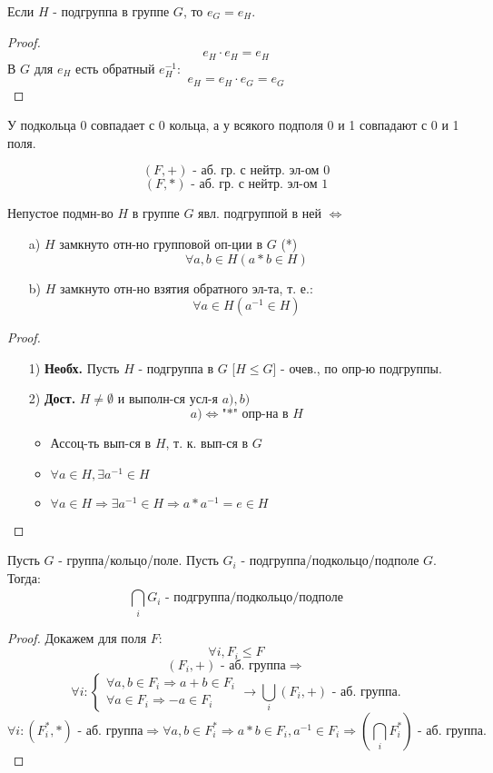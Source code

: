 \begin{statement}
Если $H$ - подгруппа в группе $G$, то $e_G = e_H$.
\end{statement}
\begin{proof}
\[
e_H \cdot e_H = e_H
\]
В $G$ для $e_H$ есть обратный $e_H^{-1}$:
\[
e_H = e_H \cdot e_G = e_G
\]
\end{proof}
\begin{consequence}
У подкольца $0$ совпадает с $0$ кольца, а у всякого подполя 0 и 1 совпадают с 0 и 1 поля.
\end{consequence}
\[
  (F, +) \text{ - аб. гр. с нейтр. эл-ом 0}
\]
\[
  (F, *) \text{ - аб. гр. с нейтр. эл-ом 1}
\]
\begin{statement}
Непустое подмн-во $H$ в группе $G$ явл. подгруппой в ней $\iff$
\begin{itemize}
  \item [a) ] $H$ замкнуто отн-но групповой оп-ции в $G$ (*)
    \[
    \forall a, b \in H (a * b \in H)
    \]
  \item [b) ] $H$ замкнуто отн-но взятия обратного эл-та, т. е.:
    \[
    \forall a \in H (a^{-1} \in H)
    \]
\end{itemize}
\end{statement}
\begin{proof}
\begin{itemize}
  \item [1) ] \textbf{Необх.} Пусть $H$ - подгруппа в $G$ [$H \leq G$] - очев., по опр-ю подгруппы.
  \item [2) ] \textbf{Дост.} $H \neq \emptyset$ и выполн-ся усл-я $a), b)$
    \[
    a) \iff \text{"*" опр-на в $H$} 
    \]
    \begin{itemize}
      \item Ассоц-ть вып-ся в $H$, т. к. вып-ся в $G$
      \item $\forall a \in H, \exists a^{-1} \in H$
      \item $\forall a \in H \Rightarrow \exists a^{-1} \in H \Rightarrow a * a^{-1} = e \in H$
    \end{itemize}
\end{itemize}
\end{proof}
\begin{statement}
Пусть $G$ - группа/кольцо/поле. Пусть $G_i$ - подгруппа/подкольцо/подполе $G$. Тогда:
\[
\bigcap_{i}^{} G_i \text{ - подгруппа/подкольцо/подполе}
\]
\end{statement}
\begin{proof}
Докажем для поля $F$:
\[
\forall i, F_i \leq F
\]
\[
  (F_i, +) \text{ - аб. группа} \Rightarrow 
\]
\[
  \forall i \colon 
\begin{cases}
\forall a, b \in F_i \Rightarrow a + b \in F_i \\
\forall a \in F_i \Rightarrow -a \in F_i
\end{cases} \rightarrow \bigcup_{i}^{} (F_i, +) \text{ - аб. группа.}
\]
\[
\forall i \colon (F_i^{*}, *) \text{ - аб. группа} \Rightarrow \forall a, b \in F_i^{*} \Rightarrow a * b \in F_i, a^{-1} \in F_i \Rightarrow (\bigcap_{i}^{}F_i^{*}) \text{ - аб. группа.}
\]
\end{proof}
